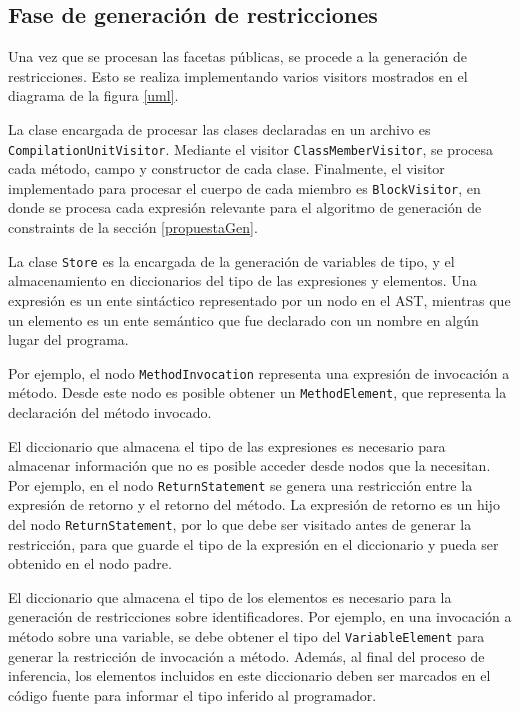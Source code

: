 \subsection{Fase de generación de restricciones}
Una vez que se procesan las facetas públicas, se procede a la generación de restricciones. Esto se realiza implementando varios visitors mostrados en el diagrama de la figura \ref{uml}.

La clase encargada de procesar las clases declaradas en un archivo es \texttt{CompilationUnitVisitor}. Mediante el visitor \texttt{ClassMemberVisitor}, se procesa cada método, campo y constructor de cada clase. Finalmente, el visitor implementado para procesar el cuerpo de cada miembro es \texttt{BlockVisitor}, en donde se procesa cada expresión relevante para el algoritmo de generación de constraints de la sección \ref{propuestaGen}.

La clase \texttt{Store} es la encargada de la generación de variables de tipo, y el almacenamiento en diccionarios del tipo de las expresiones y elementos. Una expresión es un ente sintáctico representado por un nodo en el AST, mientras que un elemento es un ente semántico que fue declarado con un nombre en algún lugar del programa.

Por ejemplo, el nodo \texttt{MethodInvocation} representa una expresión de invocación a método. Desde este nodo es posible obtener un \texttt{MethodElement}, que representa la declaración del método invocado.

El diccionario que almacena el tipo de las expresiones es necesario para almacenar información que no es posible acceder desde nodos que la necesitan. Por ejemplo, en el nodo \texttt{ReturnStatement} se genera una restricción entre la expresión de retorno y el retorno del método. La expresión de retorno es un hijo del nodo \texttt{ReturnStatement}, por lo que debe ser visitado antes de generar la restricción, para que guarde el tipo de la expresión en el diccionario y pueda ser obtenido en el nodo padre.

El diccionario que almacena el tipo de los elementos es necesario para la generación de restricciones sobre identificadores. Por ejemplo, en una invocación a método sobre una variable, se debe obtener el tipo del \texttt{VariableElement} para generar la restricción de invocación a método. Además, al final del proceso de inferencia, los elementos incluidos en este diccionario deben ser marcados en el código fuente para informar el tipo inferido al programador.

